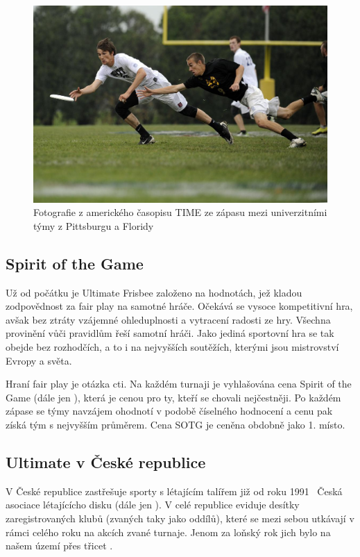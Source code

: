 \begin{figure}[ht!]
  \centering
  \includegraphics[width=130mm]{./images/ultimate-frisbee.jpg}
  \caption{Fotografie z amerického časopisu TIME ze zápasu mezi
    univerzitními týmy z Pittsburgu a Floridy~\cite{ultimate_time}\label{overflow}
    }
\end{figure}

\subsection{Spirit of the Game}

Už od počátku je Ultimate Frisbee založeno na hodnotách, jež kladou zodpovědnost za fair play na samotné hráče.
Očekává se vysoce kompetitivní hra, avšak bez ztráty vzájemné ohleduplnosti a vytracení radosti ze hry.
Všechna provinění vůči pravidlům řeší samotní hráči. Jako jediná sportovní hra se tak obejde bez rozhodčích, a to i
na nejvyšších soutěžích, kterými jsou mistrovství Evropy a světa.

Hraní fair play je otázka cti. Na každém turnaji je vyhlašována cena Spirit of the Game (dále jen ),
která je cenou pro ty, kteří se chovali nejčestněji. Po každém zápase se týmy navzájem ohodnotí
v podobě číselného hodnocení a cenu pak získá tým s nejvyšším průměrem. Cena SOTG
je ceněna obdobně jako 1. místo.

\subsection{Ultimate v České republice}

V České republice zastřešuje sporty s létajícím talířem již od roku 1991~\cite{cald_historie} Česká asociace
lé\-ta\-jícícho disku (dále jen ). V celé republice eviduje desítky zaregistrovaných
klubů (zvaných taky jako oddílů), které se mezi sebou utkávají v rámci celého roku na akcích zvané turnaje.
Jenom za loňský rok jich bylo na našem území přes třicet \cite{cald_kalendar}.

